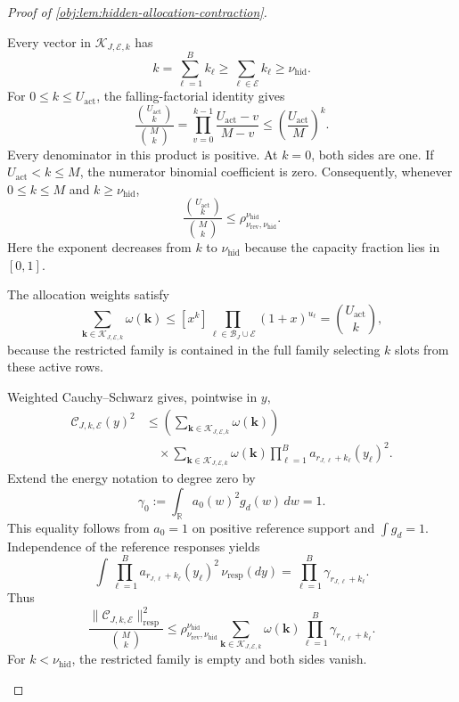 \documentclass[11pt]{article}
\begin{document}
\begin{proof}[Proof of \cref{obj:lem:hidden-allocation-contraction}]
\begin{enumerate}
Every vector in \(\mathscr K_{J,\mathcal E,k}\) has
\[
k=\sum_{\ell=1}^B k_\ell
\ge\sum_{\ell\in\mathcal E}k_\ell
\ge\nu_{\mathrm{hid}}.
\]
For \(0\le k\le U_{\mathrm{act}}\), the falling-factorial identity gives
\[
\frac{\binom{U_{\mathrm{act}}}{k}}{\binom Mk}
=
\prod_{v=0}^{k-1}
\frac{U_{\mathrm{act}}-v}{M-v}
\le
\left(\frac{U_{\mathrm{act}}}{M}\right)^k.
\]
Every denominator in this product is positive. At \(k=0\), both sides are one. If \(U_{\mathrm{act}}<k\le M\), the numerator binomial coefficient is zero. Consequently, whenever \(0\le k\le M\) and \(k\ge\nu_{\mathrm{hid}}\),
\[
\frac{\binom{U_{\mathrm{act}}}{k}}{\binom Mk}
\le
\rho_{\nu_{\mathrm{rev}},\nu_{\mathrm{hid}}}^{\nu_{\mathrm{hid}}}.
\]
Here the exponent decreases from \(k\) to \(\nu_{\mathrm{hid}}\) because the capacity fraction lies in \([0,1]\).

The allocation weights satisfy
\[
\sum_{\boldsymbol k\in\mathscr K_{J,\mathcal E,k}}
\omega(\boldsymbol k)
\le
[x^k]\prod_{\ell\in\mathcal B_J\cup\mathcal E}(1+x)^{u_\ell}
=
\binom{U_{\mathrm{act}}}{k},
\]
because the restricted family is contained in the full family selecting \(k\) slots from these active rows.

Weighted Cauchy--Schwarz gives, pointwise in \(y\),
\[
\begin{aligned}
\mathcal C_{J,k,\mathcal E}(y)^2
&\le
\left(
\sum_{\boldsymbol k\in\mathscr K_{J,\mathcal E,k}}
\omega(\boldsymbol k)
\right)
\\
&\quad{}\times
\sum_{\boldsymbol k\in\mathscr K_{J,\mathcal E,k}}
\omega(\boldsymbol k)
\prod_{\ell=1}^B
a_{r_{J,\ell}+k_\ell}(y_\ell)^2.
\end{aligned}
\]
Extend the energy notation to degree zero by
\[
\gamma_0:=
\int_{\mathbb R}a_0(w)^2g_d(w)\,dw=1.
\]
This equality follows from \(a_0=1\) on positive reference support and \(\int g_d=1\).
Independence of the reference responses yields
\[
\int
\prod_{\ell=1}^B
a_{r_{J,\ell}+k_\ell}(y_\ell)^2\,
\nu_{\mathrm{resp}}(dy)
=
\prod_{\ell=1}^B\gamma_{r_{J,\ell}+k_\ell}.
\]
Thus
\[
\frac{\|\mathcal C_{J,k,\mathcal E}\|_{\mathrm{resp}}^2}{\binom Mk}
\le
\rho_{\nu_{\mathrm{rev}},\nu_{\mathrm{hid}}}^{\nu_{\mathrm{hid}}}
\sum_{\boldsymbol k\in\mathscr K_{J,\mathcal E,k}}
\omega(\boldsymbol k)
\prod_{\ell=1}^B\gamma_{r_{J,\ell}+k_\ell}.
\]
For \(k<\nu_{\mathrm{hid}}\), the restricted family is empty and both sides vanish.


\end{enumerate}
\end{proof}
\end{document}
